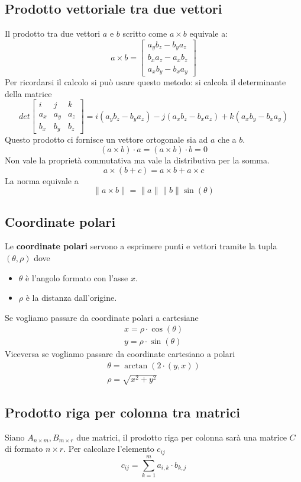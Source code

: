 \subsection{Prodotto vettoriale tra due vettori}
Il prodotto tra due vettori $a$ e $b$ scritto come $a \times b$ equivale a:
\[
	a \times b = \begin{bmatrix}
		a_y b_z - b_y a_z \\ b_x a_z - a_x b_z \\ a_x b_y - b_x a_y
	\end{bmatrix}
\]
Per ricordarsi il calcolo si pu\`o usare questo metodo: si calcola il determinante della
matrice
\[
	det \begin{bmatrix}
		i   & j   & k   \\
		a_x & a_y & a_z \\
		b_x & b_y & b_z
	\end{bmatrix} =
	i(a_y b_z - b_y a_z) - j(a_x b_z - b_x a_z) + k(a_x b_y - b_x a_y)
\]
Questo prodotto ci fornisce un vettore ortogonale sia ad $a$ che a $b$.
\[ (a \times b) \cdot a = (a \times b ) \cdot b = 0 \]
Non vale la propriet\`a commutativa ma vale la distributiva per la somma.
\[ a \times (b + c) = a \times b + a \times c \]
La norma equivale a
\[ \| a \times b \| = \| a \| \| b \| \sin(\theta) \]

\subsection{Coordinate polari}
Le \textbf{coordinate polari} servono a esprimere punti e vettori tramite la tupla
$(\theta, \rho)$ dove
\begin{itemize}
	\item $\theta$ \`e l'angolo formato con l'asse $x$.
	\item $\rho$ \`e la distanza dall'origine.
\end{itemize}
Se vogliamo passare da coordinate polari a cartesiane
\begin{gather*}
	x = \rho \cdot \cos(\theta) \\
	y = \rho \cdot \sin(\theta)
\end{gather*}
Viceversa se vogliamo passare da coordinate cartesiano a polari
\begin{gather*}
	\theta = \arctan(2 \cdot (y, x)) \\
	\rho = \sqrt{x^2 + y^2}
\end{gather*}

\subsection{Prodotto riga per colonna tra matrici}
Siano $A_{n \times m}, B_{m \times r}$ due matrici, il prodotto riga per colonna
sar\`a una matrice $C$ di formato $n \times r$. Per calcolare l'elemento $c_{ij}$
\[ c_{ij} = \sum_{k = 1}^m a_{i,k} \cdot b_{k,j} \]

